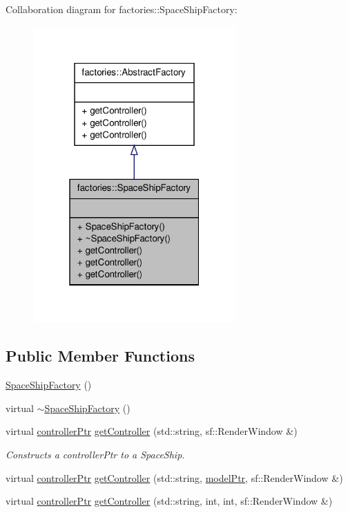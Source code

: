 \-Collaboration diagram for factories\-:\-:\-Space\-Ship\-Factory\-:
\nopagebreak
\begin{figure}[H]
\begin{center}
\leavevmode
\includegraphics[width=220pt]{db/d7a/classfactories_1_1SpaceShipFactory__coll__graph}
\end{center}
\end{figure}
\subsection*{\-Public \-Member \-Functions}
\begin{DoxyCompactItemize}
\item 
\hyperlink{classfactories_1_1SpaceShipFactory_a3afe16a4e7c380ae0a60fd8df21fa076}{\-Space\-Ship\-Factory} ()
\item 
virtual \hyperlink{classfactories_1_1SpaceShipFactory_ae1d253c1354481f99d0144565fc0861a}{$\sim$\-Space\-Ship\-Factory} ()
\item 
virtual \hyperlink{Game_8h_a21b04f6cf2d5990b82725fac5ea2ce9a}{controller\-Ptr} \hyperlink{classfactories_1_1SpaceShipFactory_a7ef6a8c8b310a5f92e6cce5bbe1bbe5a}{get\-Controller} (std\-::string, sf\-::\-Render\-Window \&)
\begin{DoxyCompactList}\small\item\em \-Constructs a controller\-Ptr to a \-Space\-Ship. \end{DoxyCompactList}\item 
virtual \hyperlink{Game_8h_a21b04f6cf2d5990b82725fac5ea2ce9a}{controller\-Ptr} \hyperlink{classfactories_1_1SpaceShipFactory_a396af5e8d82c09370bc72e78f808de35}{get\-Controller} (std\-::string, \hyperlink{ModelView_8h_a78966ddb517fca8d2b29a2bc5c31e74e}{model\-Ptr}, sf\-::\-Render\-Window \&)
\item 
virtual \hyperlink{Game_8h_a21b04f6cf2d5990b82725fac5ea2ce9a}{controller\-Ptr} \hyperlink{classfactories_1_1SpaceShipFactory_ab7590e6bf558a75bc040f2282e93ce9b}{get\-Controller} (std\-::string, int, int, sf\-::\-Render\-Window \&)
\end{DoxyCompactItemize}


